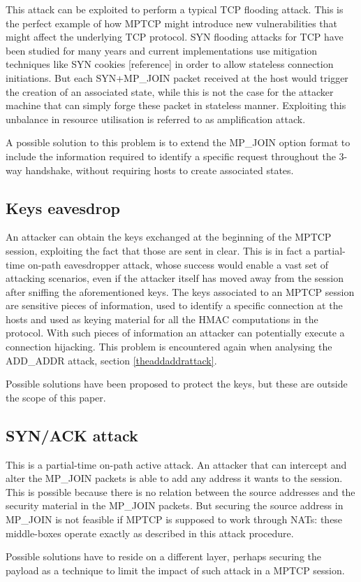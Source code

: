 This attack can be exploited to perform a typical TCP flooding attack. This is the perfect example of how MPTCP might introduce new vulnerabilities that might affect the underlying TCP protocol. 
SYN flooding attacks for TCP have been studied for many years and current implementations use mitigation techniques like SYN cookies [reference] in order to allow stateless connection initiations. But each SYN+MP\_JOIN packet received at the host would trigger the creation of an associated state, while this is not the case for the attacker machine that can simply forge these packet in stateless manner. Exploiting this unbalance in resource utilisation is referred to as amplification attack.

A possible solution to this problem is to extend the MP\_JOIN option format to include the information required to identify a specific request throughout the 3-way handshake, without requiring hosts to create associated states.

\subsection{Keys eavesdrop}
An attacker can obtain the keys exchanged at the beginning of the MPTCP session, exploiting the fact that those are sent in clear. This is in fact a partial-time on-path eavesdropper attack, whose success would enable a vast set of attacking scenarios, even if the attacker itself has moved away from the session after sniffing the aforementioned keys.
The keys associated to an MPTCP session are sensitive pieces of information, used to identify a specific connection at the hosts and used as keying material for all the HMAC computations in the protocol. With such pieces of information an attacker can potentially execute a connection hijacking. This problem is encountered again when analysing the ADD\_ADDR attack, section \ref{theaddaddrattack}.

Possible solutions have been proposed to protect the keys, but these are outside the scope of this paper.

\subsection{SYN/ACK attack}
This is a partial-time on-path active attack. An attacker that can intercept and alter the MP\_JOIN packets is able to add any address it wants to the session. This is possible because there is no relation between the source addresses and the security material in the MP\_JOIN packets. But securing the source address in MP\_JOIN is not feasible if MPTCP is supposed to work through NATs: these middle-boxes operate exactly as described in this attack procedure. 

Possible solutions have to reside on a different layer, perhaps securing the payload as a technique to limit the impact of such attack in a MPTCP session.


